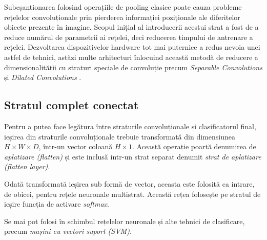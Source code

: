 Subeșantionarea folosind operațiile de pooling clasice poate cauza probleme rețelelor convoluționale prin pierderea informației poziționale ale diferitelor obiecte prezente în imagine. Scopul inițial al introducerii acestui strat a fost de a reduce numărul de parametrii ai rețelei, deci reducerea timpului de antrenare a rețelei. Dezvoltarea dispozitivelor hardware tot mai puternice a redus nevoia unei astfel de tehnici, astăzi multe arhitecturi înlocuind această metodă de reducere a dimensionalității cu straturi speciale de convoluție precum \textit{Separable Convolutions} și \textit{Dilated Convolutions} \cite{online:cnn-types}.

\subsection*{Stratul complet conectat}\label{subsec:strat-complet-con}
Pentru a putea face legătura între straturile convoluționale și clasificatorul final, ieșirea din straturile convoluționale trebuie transformată din dimensiunea $H\times W\times D$, într-un vector coloană $H\times1$. Această operație poartă denumirea de \textit{aplatizare (flatten)} și este inclusă intr-un strat separat denumit \textit{strat de aplatizare (flatten layer)}.

Odată transformată ieșirea sub formă de vector, aceasta este folosită ca intrare, de obicei, pentru rețele neuronale multistrat. Această rețea folosește pe stratul de ieșire funcția de activare \textit{softmax}.

Se mai pot folosi în schimbul rețelelor neuronale și alte tehnici de clasificare, precum \textit{mașini cu vectori suport (SVM)}.

